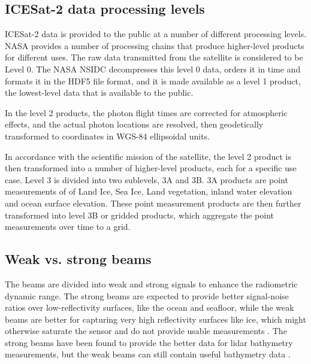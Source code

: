 
\subsection{ICESat-2 data processing levels}

ICESat-2 data is provided to the public at a number of different processing levels. NASA provides a number of processing chains that produce higher-level products for different uses. The raw data transmitted from the satellite is considered to be Level 0. The NASA NSIDC decompresses this level 0 data, orders it in time and formats it in the HDF5 file format, and it is made available as a level 1 product, the lowest-level data that is available to the public.

In the level 2 products, the photon flight times are corrected for atmospheric effects, and the actual photon locations are resolved, then geodetically transformed to coordinates in WGS-84 ellipsoidal units.

In accordance with the scientific mission of the satellite, the level 2 product is then transformed into a number of higher-level products, each for a specific use case. Level 3 is divided into two sublevels, 3A and 3B. 3A products are point measurements of of Land Ice, Sea Ice, Land vegetation, inland water elevation and ocean surface elevation. These point measurement products are then further transformed into level 3B or gridded products, which aggregate the point measurements over time to a grid.


\subsection{Weak vs. strong beams}

The beams are divided into weak and strong signals to enhance the radiometric dynamic range. The strong beams are expected to provide better signal-noise ratios over low-reflectivity surfaces, like the ocean and seafloor, while the weak beams are better for capturing very high reflectivity surfaces like ice, which might otherwise saturate the sensor and do not provide usable measurements \parencite{Neumann2019d}. The strong beams have been found to provide the better data for lidar bathymetry measurements, but the weak beams can still contain useful bathymetry data \parencite{Hsu2021}.


